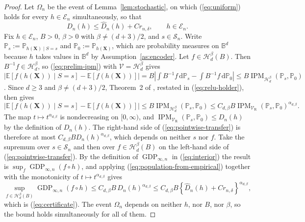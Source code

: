 \documentclass{article} %
\begin{document}
\begin{proof}
Let $\Omega_n$ be the event of Lemma~\ref{lem:stochastic}, on which (\ref{eq:uniform}) holds for every $h\in\mathcal{E}_n$ simultaneously, so that
\begin{equation}
  D_n(h)\le\widehat{D}_n(h)+Cr_{n,\delta},
  \qquad h\in\mathcal{E}_n .
  \label{eq:population-from-empirical}
\end{equation}
Fix $h\in\mathcal{E}_n$, $B>0$, $\beta>0$ with $\beta\ne(d+3)/2$, and $s\in\mathcal{S}_n$.  Write $\mathbb{P}_s:=\mathbb{P}_{h(\mathbf{X})\mid S=s}$ and $\mathbb{P}_0:=\mathbb{P}_{h(\mathbf{X})}$, which are probability measures on $\mathbb{B}^d$ because $h$ takes values in $\mathbb{B}^d$ by Assumption~\ref{as:encoder}.  Let $f\in\mathcal{H}^{\beta}_d(B)$.  Then $B^{-1}f\in\mathcal{H}^{\beta}_d$, so (\ref{eq:prelim-ipm}) with $\mathcal{V}=\mathcal{H}^{\beta}_d$ gives $\left|\mathbb{E}[f(h(\mathbf{X}))\mid S=s]-\mathbb{E}[f(h(\mathbf{X}))]\right|=B\left|\int B^{-1}f\,\mathrm{d}\mathbb{P}_s-\int B^{-1}f\,\mathrm{d}\mathbb{P}_0\right|\le B\operatorname{IPM}_{\mathcal{H}^{\beta}_d}(\mathbb{P}_s,\mathbb{P}_0)$.  Since $d\ge3$ and $\beta\ne(d+3)/2$, Theorem~2 of \citet{park2026relu}, restated in (\ref{eq:relu-holder}), then gives
\begin{equation}
  \left|\mathbb{E}\!\left[f(h(\mathbf{X}))\mid S=s\right]
        -\mathbb{E}\!\left[f(h(\mathbf{X}))\right]\right|
  \le B\operatorname{IPM}_{\mathcal{H}^{\beta}_d}(\mathbb{P}_s,\mathbb{P}_0)
  \le C_{d,\beta}B\operatorname{IPM}_{\mathcal{V}_{\mathrm{R}}}
     (\mathbb{P}_s,\mathbb{P}_0)^{\alpha_{d,\beta}} .
  \label{eq:pointwise-transfer}
\end{equation}
The map $t\mapsto t^{\alpha_{d,\beta}}$ is nondecreasing on $[0,\infty)$, and $\operatorname{IPM}_{\mathcal{V}_{\mathrm{R}}}(\mathbb{P}_s,\mathbb{P}_0)\le D_n(h)$ by the definition of $D_n(h)$.  The right-hand side of (\ref{eq:pointwise-transfer}) is therefore at most $C_{d,\beta}BD_n(h)^{\alpha_{d,\beta}}$, which depends on neither $s$ nor $f$.  Take the supremum over $s\in\mathcal{S}_n$ and then over $f\in\mathcal{H}^{\beta}_d(B)$ on the left-hand side of (\ref{eq:pointwise-transfer}).  By the definition of $\operatorname{GDP}_{\infty,n}$ in (\ref{eq:interior}) the result is $\sup_{f}\operatorname{GDP}_{\infty,n}(f\circ h)$, and applying (\ref{eq:population-from-empirical}) together with the monotonicity of $t\mapsto t^{\alpha_{d,\beta}}$ gives
\[
  \sup_{f\in\mathcal{H}^{\beta}_d(B)}
  \operatorname{GDP}_{\infty,n}(f\circ h)
  \le C_{d,\beta}B\,D_n(h)^{\alpha_{d,\beta}}
  \le C_{d,\beta}B\left\{\widehat{D}_n(h)+Cr_{n,\delta}\right\}^{\alpha_{d,\beta}} ,
\]
which is (\ref{eq:certificate}).  The event $\Omega_n$ depends on neither $h$, nor $B$, nor $\beta$, so the bound holds simultaneously for all of them.
\end{proof}
\end{document}
